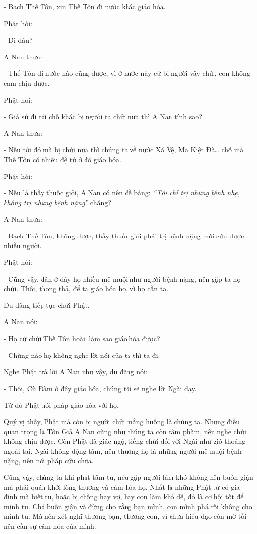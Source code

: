 \documentclass[
  12pt,
  oneside]{book}
\begin{document}
- Bạch Thế Tôn, xin Thế Tôn đi nước khác giáo hóa.

Phật hỏi:

- Đi đâu?

A Nan thưa:

- Thế Tôn đi nước nào cũng được, vì ở nước này cứ bị người vây chửi, con không cam chịu được.

Phật hỏi:

- Giả sử đi tới chỗ khác bị người ta chửi nữa thì A Nan tính sao?

A Nan thưa:

- Nếu tới đó mà bị chửi nữa thì chúng ta về nước Xá Vệ, Ma Kiệt Đà\ldots{} chỗ mà Thế Tôn có nhiều đệ tử ở đó giáo hóa.

Phật hỏi:

- Nếu là thầy thuốc giỏi, A Nan có nên đề bảng: \emph{``Tôi chỉ trị những bệnh nhẹ, không trị những bệnh nặng''} chăng?

A Nan thưa:

- Bạch Thế Tôn, không được, thầy thuốc giỏi phải trị bệnh nặng mới cứu được nhiều người.

Phật nói:

- Cũng vậy, dân ở đây họ nhiều mê muội như người bệnh nặng, nên gặp ta họ chửi. Thôi, thong thả, để ta giáo hóa họ, vì họ cần ta.

Du đãng tiếp tục chửi Phật.

A Nan nói:

- Họ cứ chửi Thế Tôn hoài, làm sao giáo hóa được?

- Chừng nào họ không nghe lời nói của ta thì ta đi.

Nghe Phật trả lời A Nan như vậy, du đãng nói:

- Thôi, Cù Đàm ở đây giáo hóa, chúng tôi sẽ nghe lời Ngài dạy.

Từ đó Phật nói pháp giáo hóa với họ.

Quý vị thấy, Phật mà còn bị người chửi mắng huống là chúng ta. Nhưng điều quan trọng là Tôn Giả A Nan cũng như chúng ta còn tâm phàm, nên nghe chửi không chịu được. Còn Phật đã giác ngộ, tiếng chửi đối với Ngài như gió thoảng ngoài tai. Ngài không động tâm, nên thương họ là những người mê muội bệnh nặng, nên nói pháp cứu chữa.

Cũng vậy, chúng ta khi phát tâm tu, nếu gặp người làm khó không nên buồn giận mà phải quán khởi lòng thương và cảm hóa họ. Nhất là những Phật tử có gia đình mà biết tu, hoặc bị chồng hay vợ, hay con làm khó dễ, đó là cơ hội tốt để mình tu. Chớ buồn giận và đừng cho rằng bạn mình, con mình phá rối không cho mình tu. Mà nên xét nghĩ thương bạn, thương con, vì chưa hiểu đạo còn mờ tối nên cần sự cảm hóa của mình.
\end{document}

